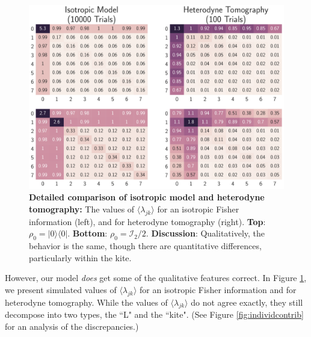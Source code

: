 \documentclass[aps,pra, twocolumn]{revtex4-1}
\begin{document}
\begin{figure}
  \includegraphics[width=\columnwidth]{Images/Figure_13.pdf}
 \caption{\textbf{Detailed comparison of isotropic model and heterodyne tomography:} The values of $\langle \lambda_{jk} \rangle$ for an isotropic Fisher information (left), and for heterodyne tomography (right). \textbf{Top}: $\rho_{0} = |0\rangle\langle 0|$. \textbf{Bottom}: $\rho_{0} = \mathcal{I}_{2}/2$. \textbf{Discussion}: Qualitatively, the behavior is the same, though there are quantitative differences, particularly within the kite.}
\label{fig:model_comparison}
\end{figure}

However, our model \emph{does} get some of the qualitative features correct. In Figure \ref{fig:model_comparison}, we present simulated values of $\langle \lambda_{jk}\rangle$ for an isotropic Fisher information and for heterodyne tomography. While the values of $\langle \lambda_{jk} \rangle$ do not agree exactly, they still decompose into two types, the ``L" and the ``kite". (See Figure \ref{fig:individcontrib} for an analysis of the discrepancies.)
 
 
\end{document}
